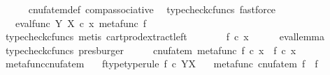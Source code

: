 \begin{isabellebody}
\ \ \ \ \isamarkupfalse%
\ cnufatem{\isacharunderscore}{\kern0pt}def{}\ comp{\isacharunderscore}{\kern0pt}associative{}\ \isamarkupfalse%
\ {\isacharparenleft}{\kern0pt}typecheck{\isacharunderscore}{\kern0pt}cfuncs{\isacharcomma}{\kern0pt}\ fastforce{\isacharparenright}{\kern0pt}\isanewline
\ \ \isamarkupfalse%
\ \isamarkupfalse%
\ {\isachardoublequoteopen}{\isachardot}{\kern0pt}{\isachardot}{\kern0pt}{\isachardot}{\kern0pt}\ {\isacharequal}{\kern0pt}\ eval{\isacharunderscore}{\kern0pt}func\ Y\ X\ {\isasymcirc}\isactrlsub c\ {\isasymlangle}x{\isacharcomma}{\kern0pt}\ {\isacharparenleft}{\kern0pt}metafunc\ f{\isacharparenright}{\kern0pt}{\isasymrangle}{\isachardoublequoteclose}\isanewline
\ \ \ \ \isamarkupfalse%
\ {\isacharparenleft}{\kern0pt}typecheck{\isacharunderscore}{\kern0pt}cfuncs{\isacharcomma}{\kern0pt}\ metis\ cart{\isacharunderscore}{\kern0pt}prod{\isacharunderscore}{\kern0pt}extract{\isacharunderscore}{\kern0pt}left{\isacharparenright}{\kern0pt}\isanewline
\ \ \isamarkupfalse%
\ \isamarkupfalse%
\ {\isachardoublequoteopen}{\isachardot}{\kern0pt}{\isachardot}{\kern0pt}{\isachardot}{\kern0pt}\ {\isacharequal}{\kern0pt}\ f\ {\isasymcirc}\isactrlsub c\ x{\isachardoublequoteclose}\isanewline
\ \ \ \ \isamarkupfalse%
\ eval{\isacharunderscore}{\kern0pt}lemma\ \isamarkupfalse%
\ {\isacharparenleft}{\kern0pt}typecheck{\isacharunderscore}{\kern0pt}cfuncs{\isacharcomma}{\kern0pt}\ presburger{\isacharparenright}{\kern0pt}\isanewline
\ \ \isamarkupfalse%
\ \isamarkupfalse%
\ {\isachardoublequoteopen}cnufatem\ {\isacharparenleft}{\kern0pt}metafunc\ f{\isacharparenright}{\kern0pt}\ {\isasymcirc}\isactrlsub c\ x\ {\isacharequal}{\kern0pt}\ f\ {\isasymcirc}\isactrlsub c\ x{\isachardoublequoteclose}\isacommand{{\isachardot}{\kern0pt}}\isamarkupfalse%
\isanewline
{}\isamarkupfalse%
%
\endisatagproof
{\isafoldproof}%
%
\isadelimproof
\isanewline
%
\endisadelimproof
\isanewline
{}\isamarkupfalse%
\ metafunc{\isacharunderscore}{\kern0pt}cnufatem{\isacharcolon}{\kern0pt}\isanewline
\ \ \ f{\isacharunderscore}{\kern0pt}type{\isacharbrackleft}{\kern0pt}type{\isacharunderscore}{\kern0pt}rule{\isacharbrackright}{\kern0pt}{\isacharcolon}{\kern0pt}\ {\isachardoublequoteopen}f\ {\isasymin}\isactrlsub c\ Y\isactrlbsup X\isactrlesup {\isachardoublequoteclose}\isanewline
\ \ \ {\isachardoublequoteopen}metafunc\ {\isacharparenleft}{\kern0pt}cnufatem\ f{\isacharparenright}{\kern0pt}\ {\isacharequal}{\kern0pt}\ f{\isachardoublequoteclose}\isanewline

\end{isabellebody}
